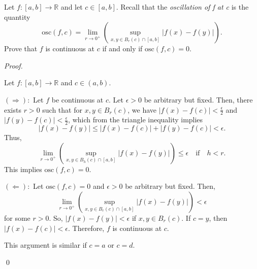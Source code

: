 \documentclass[12pt]{article}
\newenvironment{problem}[2][Problem]{\begin{trivlist}
\item[\hskip \labelsep {\bfseries #1}\hskip \labelsep {\bfseries
#2.}]}{\end{trivlist}}
\newenvironment{sol}
    {\emph{Proof.}
    }
    {
    \qed
    }
\begin{document}
\begin{problem}{29}
  Let $f : [a,b] \to \mathbb{R}$ and let $c \in [a,b].$ Recall that the \textit{oscillation of f at c} is the quantity $$\text{osc}(f,c) = \lim_{r \to 0^+} \left( \sup_{x,y \in B_r(c) \cap [a,b]} \left| f(x) - f(y) \right| \right).$$ 
  Prove that $f$ is continuous at $c$ if and only if $\text{osc}(f,c) = 0$.
  \end{problem}
  \begin{sol}
  Let $f : [a,b] \to \mathbb{R}$ and $c \in (a,b)$. 
  
  $(\Longrightarrow):$ Let $f$ be continuous at $c$. Let $\epsilon > 0$ be arbitrary but fixed. Then, there exists $r > 0$ such that for $x,y \in B_r(c)$, we have $\left| f(x) - f(c) \right| < \frac{\epsilon}{2}$ and $\left| f(y) - f(c) \right| < \frac{\epsilon}{2}$, which from the triangle inequality implies $$\left| f(x) - f(y) \right| \leq \left| f(x) - f(c) \right| + \left| f(y) - f(c) \right| < \epsilon.$$ Thus, $$\lim_{r \to 0^+} \left( \sup_{x,y \in B_h(c) \cap [a,b]} \left| f(x) - f(y) \right| \right) \leq \epsilon \hspace{1em} \text{if} \hspace{1em} h < r.$$ This implies $\text{osc}(f,c) = 0$.
  
  $(\Longleftarrow):$ Let $\text{osc}(f,c) = 0$ and $\epsilon > 0$ be arbitrary but fixed. Then, $$\lim_{r \to 0^+} \left( \sup_{x,y \in B_r(c) \cap [a,b]} \left| f(x) - f(y) \right| \right) < \epsilon$$ for some $r > 0$.
  So, $\left| f(x) - f(y) \right| < \epsilon$ if $x,y \in B_r(c)$. If $c = y$, then $\left| f(x) - f(c) \right| < \epsilon$. Therefore, $f$ is continuous at $c$.
  
  This argument is similar if $c = a$ or $c = d$.
  \end{sol}
  
\end{document}

